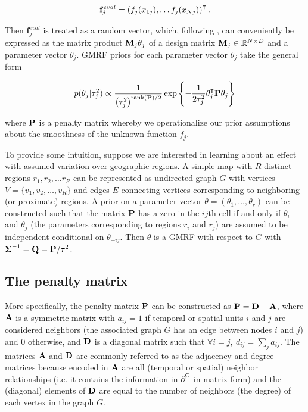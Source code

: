 \begin{equation*}
\mathbf{f}_j^{eval} = \left(f_j(x_{1j}), \dots f_j(x_{Nj})\right)^\intercal.  
 \end{equation*}
 
\noindent Then $\mathbf{f}_j^{eval}$ is treated as a random vector, which, following , can conveniently be expressed as the matrix product $\mathbf{M}_j \theta_j$ of a design matrix $\mathbf{M}_j \in \mathbb{R}^{N \times D}$ and a parameter vector $\theta_j$. GMRF priors for each parameter vector $\theta_j$ take the general form

\begin{equation*}
p(\theta_j | \tau^2_j) 
\propto 
\frac{1}{\left(\tau^2_j\right)^{{\rm rank}(\mathbf{P})/2} }
\exp{\left\{-\frac{1}{2\tau^2_j} \theta_j^\intercal \mathbf{P} \theta_j\right\}}
\end{equation*}

\noindent where $\mathbf{P}$ is a penalty matrix whereby we operationalize our prior assumptions about the smoothness of the unknown function $f_j$. 

To provide some intuition, suppose we are interested in learning about an effect with assumed variation over geographic regions.  A simple map with $R$ distinct regions $r_1, r_2, \dots r_R$ can be represented as undirected graph $G$ with vertices $V = \{v_1, v_2, \dots, v_R\}$ and edges $E$ connecting vertices corresponding to neighboring (or proximate) regions. A prior on a parameter vector $\theta = (\theta_1, \dots, \theta_r)$ can be constructed such that the matrix $\mathbf{P}$ has a zero in the $ij$th cell if and only if $\theta_i$ and $\theta_j$ (the parameters corresponding to regions $r_i$ and $r_j$) are assumed to be independent conditional on $\theta_{-ij}$. Then $\theta$ is a GMRF with respect to $G$ with $\boldsymbol{\Sigma}^{-1} = \mathbf{Q} = \mathbf{P}/\tau^2$. 

\subsection{The penalty matrix} 
\label{penalty_matrix}

More specifically, the penalty matrix $\mathbf{P}$ can be constructed as  $\mathbf{P} = \mathbf{D} - \mathbf{A}$, where $\mathbf{A}$ is a symmetric matrix with $a_{ij} = 1$ if temporal or spatial units $i$ and $j$ are considered neighbors (the associated graph $G$ has an edge between nodes $i$ and $j$) and 0 otherwise, and $\mathbf{D}$ is a diagonal matrix such that $\forall i = j, \: d_{ij} = \sum_j a_{ij}$. The matrices $\mathbf{A}$ and $\mathbf{D}$ are commonly referred to as the adjacency and degree matrices because encoded in $\mathbf{A}$ are all (temporal or spatial) neighbor relationships (i.e. it contains the information in $\partial^\mathbf{G}$ in matrix form) and the (diagonal) elements of $\mathbf{D}$ are equal to the number of neighbors (the degree) of each vertex in the graph $G$. 

